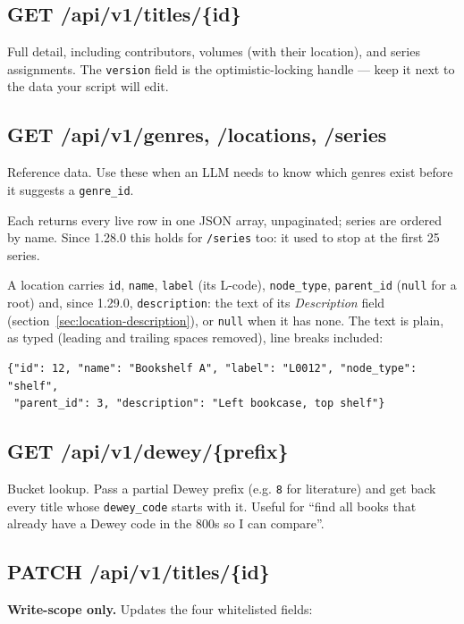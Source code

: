 \subsection{GET /api/v1/titles/\{id\}}

Full detail, including contributors, volumes (with their
location), and series assignments. The
\texttt{version} field is the optimistic-locking handle —
keep it next to the data your script will edit.

\subsection{GET /api/v1/genres, /locations, /series}

Reference data. Use these when an LLM needs to know which genres
exist before it suggests a \texttt{genre\_id}.

Each returns every live row in one JSON array, unpaginated; series
are ordered by name. Since 1.28.0 this holds for
\texttt{/series} too: it used to stop at the first 25 series.

A location carries \texttt{id}, \texttt{name}, \texttt{label} (its
L-code), \texttt{node\_type}, \texttt{parent\_id} (\texttt{null} for a
root) and, since 1.29.0, \texttt{description}: the text of its
\emph{Description} field (section~\ref{sec:location-description}), or
\texttt{null} when it has none. The text is plain, as typed (leading
and trailing spaces removed), line breaks included:

\begin{lstlisting}
{"id": 12, "name": "Bookshelf A", "label": "L0012", "node_type": "shelf",
 "parent_id": 3, "description": "Left bookcase, top shelf"}
\end{lstlisting}

\subsection{GET /api/v1/dewey/\{prefix\}}

Bucket lookup. Pass a partial Dewey prefix (e.g.
\texttt{8} for literature) and get back every title whose
\texttt{dewey\_code} starts with it. Useful for ``find all books
that already have a Dewey code in the 800s so I can compare''.

\subsection{PATCH /api/v1/titles/\{id\}}

\textbf{Write-scope only.} Updates the four whitelisted fields:

